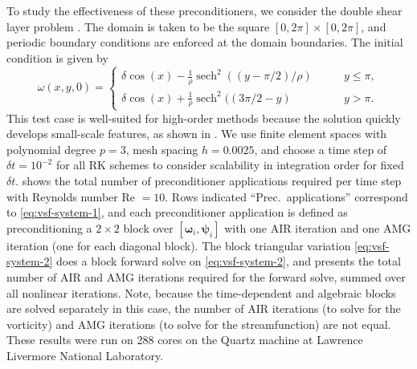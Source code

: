 \documentclass[review]{siamart}
\begin{document}
To study the effectiveness of these preconditioners, we consider the double
shear layer problem \cite{Bell1989}. The domain is taken to be the square
$[0,2\pi] \times [0,2\pi]$, and periodic boundary conditions are enforced at the
domain boundaries. The initial condition is given by
\[
	\omega(x,y,0) = \begin{cases}
		\delta \cos(x) - \frac{1}{\rho}\operatorname{sech}^2((y-\pi/2)/\rho) \qquad & y \leq \pi, \\
		\delta \cos(x) + \frac{1}{\rho}\operatorname{sech}^2((3\pi/2 - y) \qquad & y > \pi.
	\end{cases}
\]
This test case is well-suited for high-order methods because the solution
quickly develops small-scale features, as shown in . We use finite
element spaces with polynomial degree $p=3$, mesh spacing $h = 0.0025$, and
choose a time step of $\delta t = 10^{-2}$ for all RK schemes to consider
scalability in integration order for fixed $\delta t$. 
shows the total number of preconditioner applications required per time step
with Reynolds number Re  $=10$. Rows indicated ``Prec.\ applications''
correspond to \eqref{eq:vsf-system-1}, and each preconditioner application is
defined as preconditioning a $2\times 2$ block over
$[\boldsymbol{\omega}_i,\boldsymbol{\psi}_i]$ with {one} AIR iteration and one
AMG iteration (one for each diagonal block). The block triangular variation
\eqref{eq:vsf-system-2} does a block forward solve on \eqref{eq:vsf-system-2},
and  presents the total number of AIR and AMG iterations
required for the forward solve, summed over all nonlinear iterations. Note,
because the time-dependent and algebraic blocks are solved separately in this
case, the number of AIR iterations (to solve for the vorticity) and AMG
iterations (to solve for the streamfunction) are not equal. These results were
run on 288 cores on the Quartz machine at Lawrence Livermore National
Laboratory.
\end{document}
